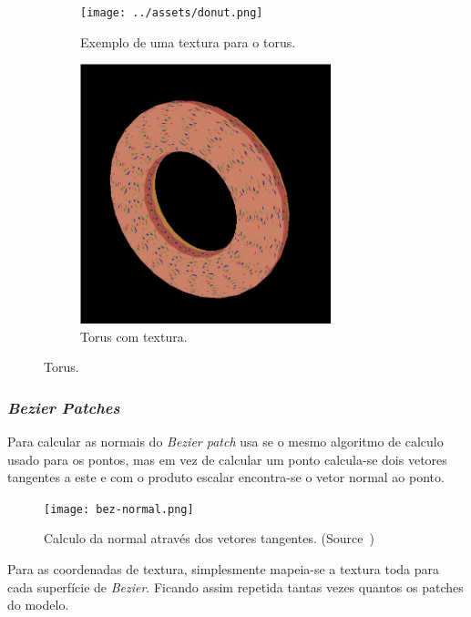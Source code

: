 \documentclass[a4paper]{article}
\begin{document}
\begin{figure}[H]
    \centering
    \begin{subfigure}{0.4\textwidth}
        \texttt{[image: ../assets/donut.png]}
        \caption{Exemplo de uma textura para o torus.}
    \end{subfigure}
    \begin{subfigure}{0.4\textwidth}
        \centering
        \includegraphics[width=0.8\textwidth]{torus.png}
        \caption{Torus com textura.}
    \end{subfigure}
    \caption{Torus.}
\end{figure}

\subsubsection{\textit{Bezier Patches}}

Para calcular as normais do \textit{Bezier patch} usa se o mesmo algoritmo de
calculo usado para os pontos, mas em vez de calcular um ponto calcula-se dois
vetores tangentes a este e com o produto escalar encontra-se o vetor normal ao
ponto.

\begin{figure}[H]
    \centering
    \texttt{[image: bez-normal.png]}
    \caption{Calculo da normal através dos vetores tangentes.
    (Source~\cite{Bezier})}
\end{figure}

Para as coordenadas de textura, simplesmente mapeia-se a textura toda para cada
superfície de \textit{Bezier}. Ficando assim repetida tantas vezes quantos os
patches do modelo.
\end{document}
